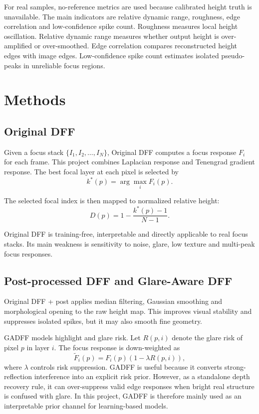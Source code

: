 \documentclass[11pt,a4paper]{article}
\begin{document}
For real samples, no-reference metrics are used because calibrated height truth is unavailable. The main indicators are relative dynamic range, roughness, edge correlation and low-confidence spike count. Roughness measures local height oscillation. Relative dynamic range measures whether output height is over-amplified or over-smoothed. Edge correlation compares reconstructed height edges with image edges. Low-confidence spike count estimates isolated pseudo-peaks in unreliable focus regions.

\section{Methods}

\subsection{Original DFF}

Given a focus stack \(\{I_1,I_2,\ldots,I_N\}\), Original DFF computes a focus response \(F_i\) for each frame. This project combines Laplacian response and Tenengrad gradient response. The best focal layer at each pixel is selected by
\begin{equation}
k^*(p)=\arg\max_i F_i(p).
\end{equation}

The selected focal index is then mapped to normalized relative height:
\begin{equation}
D(p)=1-\frac{k^*(p)-1}{N-1}.
\end{equation}

Original DFF is training-free, interpretable and directly applicable to real focus stacks. Its main weakness is sensitivity to noise, glare, low texture and multi-peak focus responses.

\subsection{Post-processed DFF and Glare-Aware DFF}

Original DFF + post applies median filtering, Gaussian smoothing and morphological opening to the raw height map. This improves visual stability and suppresses isolated spikes, but it may also smooth fine geometry.

GADFF models highlight and glare risk. Let \(R(p,i)\) denote the glare risk of pixel \(p\) in layer \(i\). The focus response is down-weighted as
\begin{equation}
\tilde{F}_i(p)=F_i(p)(1-\lambda R(p,i)),
\end{equation}
where \(\lambda\) controls risk suppression. GADFF is useful because it converts strong-reflection interference into an explicit risk prior. However, as a standalone depth recovery rule, it can over-suppress valid edge responses when bright real structure is confused with glare. In this project, GADFF is therefore mainly used as an interpretable prior channel for learning-based models.
\end{document}
